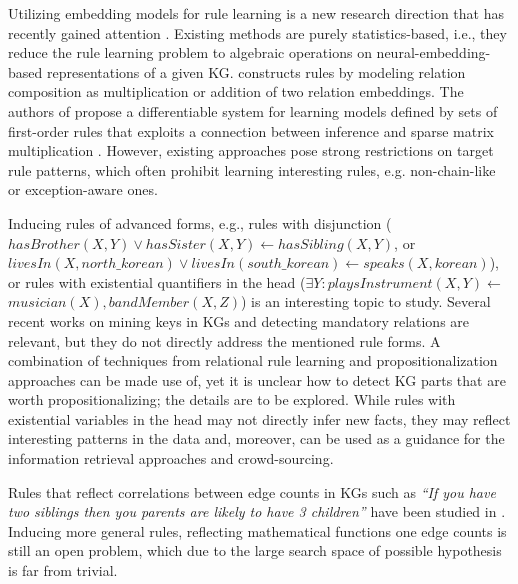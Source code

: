  Utilizing embedding models for rule learning is a new research direction that has recently gained attention \cite{DBLP:conf/nips/YangYC17,DBLP:journals/corr/YangYHGD14a}. Existing methods are purely statistics-based, i.e., they reduce the rule learning problem to algebraic operations on neural-embedding-based representations of a given KG.  \cite{DBLP:journals/corr/YangYHGD14a} constructs rules by modeling relation composition as multiplication or addition of two relation embeddings. The authors of \cite{DBLP:conf/nips/YangYC17} propose a differentiable system for learning models defined by sets of first-order rules that exploits a connection between inference and sparse matrix multiplication \cite{DBLP:journals/corr/Cohen16b}. However, existing approaches pose strong restrictions on target rule patterns, which often prohibit learning interesting rules, e.g. non-chain-like or exception-aware ones.

Inducing rules of  advanced forms, e.g., %
rules with disjunction (\eg $hasBrother(X,Y) \vee hasSister(X,Y) \leftarrow hasSibling(X,Y)$, or $livesIn(X, north\_korean) \vee livesIn(south\_korean) \leftarrow speaks(X, korean) $), or rules with existential quantifiers in the head (\eg $\exists Y: playsInstrument(X, Y) \leftarrow$ $musician(X),bandMember(X,Z)$) is an interesting topic to study. Several recent works on mining keys in KGs \cite{vickey,DBLP:conf/www/LajusS18} and detecting mandatory relations are relevant, but they do not directly address the mentioned rule forms. A combination of techniques from relational rule learning \cite{DBLP:books/daglib/0021868} and propositionalization approaches \cite{propos} can be made use of, yet it is unclear how to detect KG parts that are worth propositionalizing; the details are to be explored. %
While rules with existential variables in the head may not directly infer new facts, they may reflect interesting patterns in the data and, moreover, can be used as a guidance for the information retrieval approaches and crowd-sourcing.

Rules that reflect correlations between edge counts in KGs such as \emph{``If you have two siblings then you parents are likely to have 3 children''} have been studied in \cite{carl}. Inducing more general rules, reflecting mathematical functions one edge counts is still an open problem, which due to the large search space of possible hypothesis is far from trivial.

